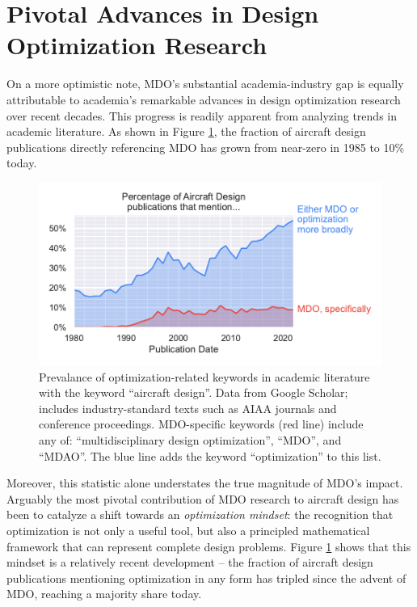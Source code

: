 \documentclass[12pt,vi,oneside]{report}
\begin{document}
    \section{Pivotal Advances in Design Optimization Research}
    \label{sec:literature_advances}

    On a more optimistic note, MDO's substantial academia-industry gap is equally attributable to academia's remarkable advances in design optimization research over recent decades. This progress is readily apparent from analyzing trends in academic literature. As shown in Figure \ref{fig:mdo_citation_counts}, the fraction of aircraft design publications directly referencing MDO has grown from near-zero in 1985 to 10\% today.

    \begin{figure}[h]
        \centering
        \includegraphics{../figures/mdo_citation_counts}
        \caption{Prevalance of optimization-related keywords in academic literature with the keyword ``aircraft design''. Data from Google Scholar; includes industry-standard texts such as AIAA journals and conference proceedings. MDO-specific keywords (red line) include any of: ``multidisciplinary design optimization'', ``MDO'', and ``MDAO''. The blue line adds the keyword ``optimization'' to this list.}
        \label{fig:mdo_citation_counts}
    \end{figure}

    Moreover, this statistic alone understates the true magnitude of MDO's impact. Arguably the most pivotal contribution of MDO research to aircraft design has been to catalyze a shift towards an \textit{optimization mindset}: the recognition that optimization is not only a useful tool, but also a principled mathematical framework that can represent complete design problems. Figure \ref{fig:mdo_citation_counts} shows that this mindset is a relatively recent development -- the fraction of aircraft design publications mentioning optimization in any form has tripled since the advent of MDO, reaching a majority share today.
\end{document}
